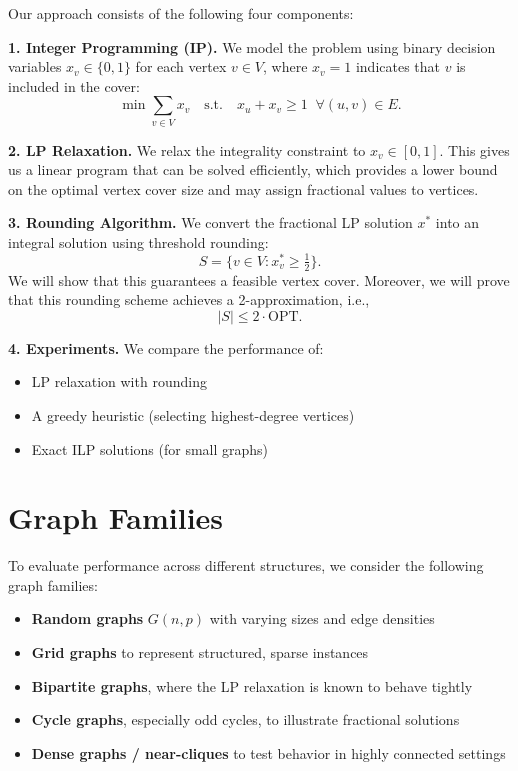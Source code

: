 \documentclass[11pt,a4paper]{article}
\begin{document}
Our approach consists of the following four components:

\textbf{1. Integer Programming (IP).}  
We model the problem using binary decision variables $x_v \in \{0,1\}$ for each
vertex $v \in V$, where $x_v = 1$ indicates that $v$ is included in the cover:
\[
\min \sum_{v \in V} x_v \quad \text{s.t.} \quad x_u + x_v \geq 1 \;\;\forall (u,v)\in E.
\]

\textbf{2. LP Relaxation.}  
We relax the integrality constraint to $x_v \in [0,1]$. This gives us a linear program that can be solved efficiently, which provides a lower bound on the optimal vertex cover size and may assign fractional values to vertices.

\textbf{3. Rounding Algorithm.}  
We convert the fractional LP solution $x^*$ into an integral solution using
threshold rounding:
\[
S = \{ v \in V : x_v^* \geq \tfrac{1}{2} \}.
\]
We will show that this guarantees a feasible vertex cover. Moreover, we will prove that this rounding scheme achieves a 2-approximation, i.e.,
\[
|S| \leq 2 \cdot \text{OPT}.
\]

\textbf{4. Experiments.}  
We compare the performance of:
\begin{itemize}[leftmargin=*]
    \item LP relaxation with rounding
    \item A greedy heuristic (selecting highest-degree vertices)
    \item Exact ILP solutions (for small graphs)
\end{itemize}

\section{Graph Families}

To evaluate performance across different structures, we consider the following
graph families:

\begin{itemize}[leftmargin=*]
    \item \textbf{Random graphs} $G(n,p)$ with varying sizes and edge densities
    \item \textbf{Grid graphs} to represent structured, sparse instances
    \item \textbf{Bipartite graphs}, where the LP relaxation is known to behave tightly
    \item \textbf{Cycle graphs}, especially odd cycles, to illustrate fractional solutions
    \item \textbf{Dense graphs / near-cliques} to test behavior in highly connected settings
\end{itemize}
\end{document}
